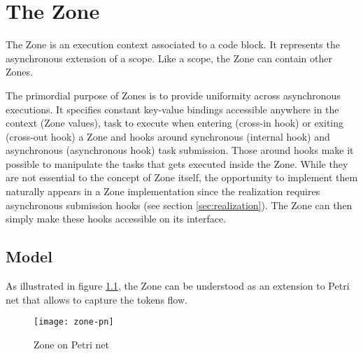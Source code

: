 \chapter{The Zone}
\label{ch:zone}

The Zone is an execution context associated to a code block. It represents the asynchronous extension of a scope. Like a scope, the Zone can contain other Zones.


The primordial purpose of Zones is to provide uniformity across asynchronous executions. It specifies constant key-value bindings accessible anywhere in the context (Zone values), task to execute when entering (cross-in hook) or exiting (cross-out hook) a Zone and hooks around synchronous (internal hook) and asynchronous (asynchronous hook) task submission. Those around hooks make it possible to manipulate the tasks that gets executed inside the Zone. While they are not essential to the concept of Zone itself, the opportunity to implement them naturally appears in a Zone implementation since the realization requires asynchronous submission hooks (see section \ref{sec:realization}). The Zone can then simply make these hooks accessible on its interface.

\section{Model}

As illustrated in figure \ref{fig:zpn}, the Zone can be understood as an extension to Petri net that allows to capture the tokens flow.

\begin{figure}
  \centering
  \texttt{[image: zone-pn]}
  \caption{Zone on Petri net}
  \label{fig:zpn}
\end{figure}

